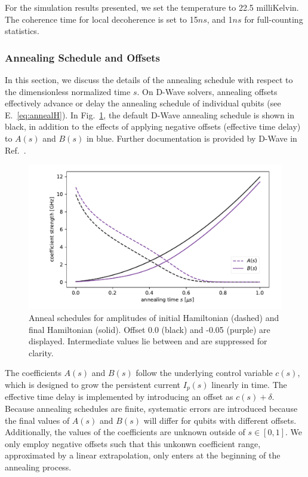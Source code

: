 \documentclass[10pt]{iopart}
\begin{document}
For the simulation results presented, we set the temperature to 22.5 milliKelvin.
The coherence time for local decoherence is set to 15$ns$, and 1$ns$ for full-counting statistics.

\subsubsection{Annealing Schedule and Offsets}
\label{sec:methods:annealing-schedule}
In this section, we discuss the details of the annealing schedule with respect to the dimensionless normalized time $s$.
On D-Wave solvers, annealing offsets effectively advance or delay the annealing schedule of individual qubits (see E.~\eqref{eq:annealH}).
In Fig.~\ref{fig:anneal_schedule}, the default D-Wave annealing schedule is shown in black, in addition to the effects of applying negative offsets (effective time delay) to $A(s)$ and $B(s)$ in blue.
Further documentation is provided by D-Wave in Ref.~\cite{dwave_as, dwave_as_docu}.

\begin{figure}[htb]
 \centering
  \includegraphics[width=\columnwidth]{./new_figures/anneal_schedule.pdf}
  \caption{
  Anneal schedules for amplitudes of initial Hamiltonian (dashed) and final Hamiltonian (solid).
  Offset 0.0 (black) and -0.05 (purple) are displayed.
  Intermediate values lie between and are suppressed for clarity.
 }
 \label{fig:anneal_schedule}
\end{figure}

The coefficients $A(s)$ and $B(s)$ follow the underlying control variable $c(s)$, which is designed to grow the persistent current $I_p(s)$ linearly in time.
The effective time delay is implemented by introducing an offset as $c(s) + \delta$.
Because annealing schedules are finite, systematic errors are introduced because the final values of $A(s)$ and $B(s)$ will differ for qubits with different offsets.
Additionally, the values of the coefficients are unknown outside of $s\in [0, 1]$.
We only employ negative offsets such that this unkonwn coefficient range, approximated by a linear extrapolation, only enters at the beginning of the annealing process.
\end{document}
